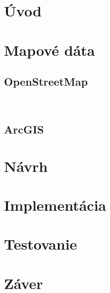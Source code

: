 \chapter{Úvod}


\blindtext[3]

\chapter{Mapové dáta} 
\label{map-data}

\section{OpenStreetMap}
~\cite{openstreet}
\Blindtext

\section{ArcGIS}
\blindtext[4]


\chapter{Návrh}
\label{navrh}
\blindtext[2]

\Blindtext


\chapter{Implementácia}
\label{implementacia}

\blindtext[13]


\chapter{Testovanie}
\label{testovanie}

\blindtext[1]

\blindtext[10]



\chapter{Záver}
\label{zaver}

\blindtext[3]




